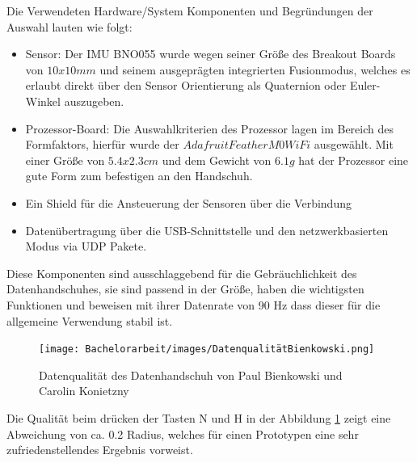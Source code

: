 Die Verwendeten Hardware/System Komponenten und Begründungen der Auswahl lauten wie folgt:
\begin{itemize}
    \item Sensor: Der IMU BNO055 wurde wegen seiner Größe des Breakout Boards von $10 x 10mm$ und seinem ausgeprägten integrierten Fusionmodus, welches es erlaubt direkt über den Sensor Orientierung als Quaternion oder Euler-Winkel auszugeben.
    \item Prozessor-Board: Die Auswahlkriterien des Prozessor lagen im Bereich des Formfaktors, hierfür wurde der $Adafruit Feather M0 WiFi$ ausgewählt. Mit einer Größe von $5.4 x 2.3 cm$ und dem Gewicht von $6.1 g$ hat der Prozessor eine gute Form zum befestigen an den Handschuh. 
    \item Ein Shield für die Ansteuerung der Sensoren über die \iic Verbindung
    \item Datenübertragung über die USB-Schnittstelle und den netzwerkbasierten Modus via UDP Pakete.
\end{itemize}
Diese Komponenten sind ausschlaggebend für die Gebräuchlichkeit des Datenhandschuhes, sie sind passend in der Größe, haben die wichtigsten Funktionen und beweisen mit ihrer Datenrate von 90 Hz dass dieser für die allgemeine Verwendung stabil ist. 
\begin{figure}[h]
	\centering
    \texttt{[image: Bachelorarbeit/images/DatenqualitätBienkowski.png]}
    \caption{Datenqualität des Datenhandschuh von Paul Bienkowski und Carolin Konietzny}
    \label{fig:DatenqualitätBienkowski}
\end{figure}

Die Qualität beim drücken der Tasten N und H in der Abbildung \ref{fig:DatenqualitätBienkowski} zeigt eine Abweichung von ca. 0.2 Radius, welches für einen Prototypen eine sehr zufriedenstellendes Ergebnis vorweist.

\newpage


